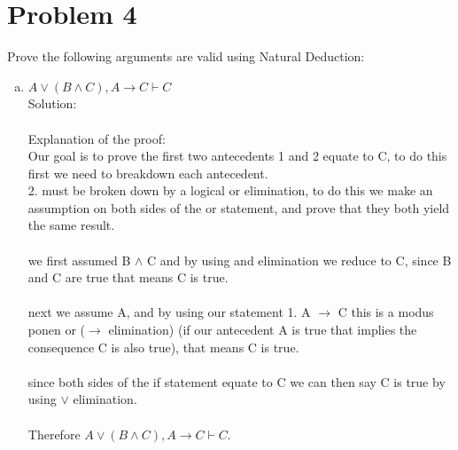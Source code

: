 \documentclass{article}
\newcommand*\moveToRight[1]{\hspace*{0em plus 1fill}\makebox{(#1)}}
\begin{document}
\section{Problem 4}
Prove the following arguments are valid using Natural Deduction: \moveToRight{20 marks}
    \begin{enumerate}[(a)]
        \item $A \vee (B \wedge C), A \to C \vdash C$\moveToRight{10 marks}\\
        Solution:\\
        \\
        Explanation of the proof:\\
        Our goal is to prove the first two antecedents 1 and 2 equate to C, to do this first we need to breakdown each antecedent. 
        \\2. must be broken down by a logical or elimination, to do this we make an assumption on both sides of the or statement, and prove that they both yield the same result. 
        \\\\we first assumed B $\wedge$ C and by using and elimination we reduce to C, since B and C are true that means C is true.
        \\\\next we assume A, and by using our statement 1. A $\to$ C this is a modus ponen or ($\to$ elimination) (if our antecedent A is true that implies the consequence C is also true), that means C is true.
        \\\\since both sides of the if statement equate to C we can then say C is true by using $\vee$ elimination.
        \\\\Therefore $A \vee (B \wedge C), A \to C \vdash C$.        
        \newpage
        

\end{enumerate}
\end{document}
